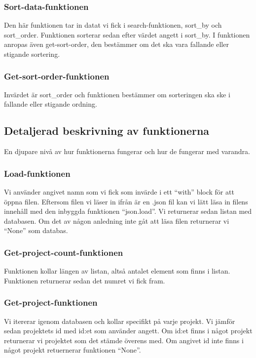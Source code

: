 \documentclass{TDP003mall}
\begin{document}
\subsubsection{Sort-data-funktionen}
Den här funktionen tar in datat vi fick i search-funktionen, sort\_by och sort\_order. Funktionen sorterar sedan efter värdet angett i sort\_by. I funktionen anropas även get-sort-order, den bestämmer om det ska vara fallande eller stigande sortering.

\subsubsection{Get-sort-order-funktionen}
Invärdet är sort\_order och funktionen bestämmer om sorteringen ska ske i fallande eller stigande ordning.\pagebreak

\subsection{Detaljerad beskrivning av funktionerna}
En djupare nivå av hur funktionerna fungerar och hur de fungerar med varandra.

\subsubsection{Load-funktionen}
Vi använder angivet namn som vi fick som invärde i ett ``with'' block för att öppna filen. Eftersom filen vi läser in ifrån är en .json fil kan vi lätt läsa in filens innehåll med den inbyggda funktionen ``json.load''. Vi returnerar sedan listan med databasen. Om det av någon anledning inte gåt att läsa filen returnerar vi ``None'' som databas. 

\subsubsection{Get-project-count-funktionen}
Funktionen kollar längen av listan, altså antalet element som finns i listan. Funktionen returnerar sedan det numret vi fick fram.

\subsubsection{Get-project-funktionen}
Vi itererar igenom databasen och kollar specifikt på varje projekt. Vi jämför sedan projektets id med id:et som använder angett. Om id:et finns i något projekt returnerar vi projektet som det stämde överens med. Om angivet id inte finns i något projekt retuernerar funktionen ``None''. 
\end{document}
